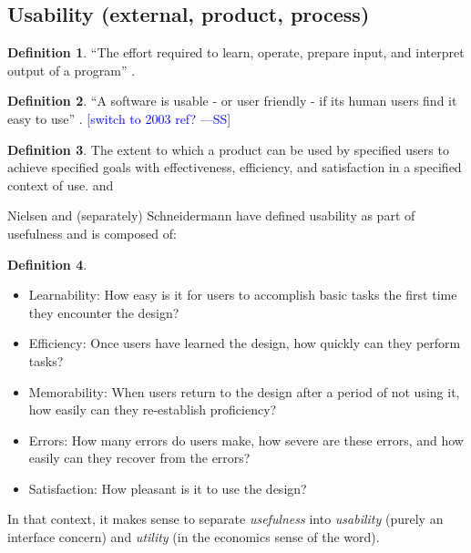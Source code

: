 \documentclass[letterpaper, cleveref]{lipics-v2019}
\newcommand{\authornote}[3]{\textcolor{#1}{[#3 ---#2]}}
\newcommand{\authornote}[3]{}
\newcommand{\wss}[1]{\authornote{blue}{SS}{#1}} %
\newcommand{\jc}[1]{\authornote{red}{JC}{#1}} %
\newcommand{\notdone}[1]{\textcolor{red}{#1}}
\theoremstyle{definition}
\newtheorem{defn}{Definition}
\begin{document}

\subsection{Usability (external, product, process) } %

\begin{defn}
  ``The effort required to learn, operate, prepare input, and interpret output
  of a program'' \citep{McCallEtAl1977}.
\end{defn}

\begin{defn}
  ``A software is usable - or user friendly - if its human users find it easy
  to use'' \citep{ghezzi1991fundamentals}. \wss{switch to 2003 ref?}
\end{defn}

\begin{defn}
  The extent to which a product can be used by specified users to achieve
  specified goals with effectiveness, efficiency, and satisfaction in a
  specified context of use. \cite{ISO16982:2002} and \cite{ISO9241:11}
\end{defn}

Nielsen and (separately) Schneidermann have defined usability as part of
usefulness and is composed of:
\begin{defn}
\begin{itemize}
\item Learnability: How easy is it for users to accomplish basic tasks the first
  time they encounter the design?
\item Efficiency: Once users have learned the design, how quickly can they
  perform tasks?
\item Memorability: When users return to the design after a period of not using
  it, how easily can they re-establish proficiency?
\item Errors: How many errors do users make, how severe are these errors, and
  how easily can they recover from the errors?
\item Satisfaction: How pleasant is it to use the design?
\end{itemize}
In that context, it makes sense to separate \emph{usefulness} into
\emph{usability} (purely an interface concern) and \emph{utility} (in the
economics sense of the word).
\cite{NielsenNorman} %
\end{defn}
\end{document}
